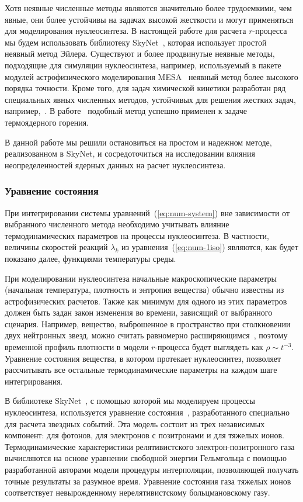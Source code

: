 Хотя неявные численные методы являются значительно более трудоемкими, чем явные, они более устойчивы на задачах высокой жесткости и могут применяться для моделирования нуклеосинтеза. В настоящей работе для расчета $r$-процесса мы будем использовать библиотеку SkyNet~\cite{lippuner2017}, которая использует простой неявный метод Эйлера. Существуют и более продвинутые неявные методы, подходящие для симуляции нуклеосинтеза, например, используемый в пакете модулей астрофизического моделирования MESA~\cite{paxton2011} неявный метод более высокого порядка точности. Кроме того, для задач химической кинетики разработан ряд специальных явных численных методов, устойчивых для решения жестких задач, например,~\cite{bulatov2018}. В работе~\cite{guidry2013} подобный метод успешно применен к задаче термоядерного горения.

В данной работе мы решили остановиться на простом и надежном методе, реализованном в SkyNet, и сосредоточиться на исследовании влияния неопределенностей ядерных данных на расчет нуклеосинтеза.

\subsubsection{Уравнение состояния}
\label{sec:eos}
При интегрировании системы уравнений~(\ref{eq:num-system}) вне зависимости от выбранного численного метода необходимо учитывать влияние термодинамических параметров на процессы нуклеосинтеза. В частности, величины скоростей реакций $\lambda_k$ из уравнения~(\ref{eq:num-1iso}) являются, как будет показано далее, функциями температуры среды. 

При моделировании нуклеосинтеза начальные макроскопические параметры (начальная температура, плотность и энтропия вещества) обычно известны из астрофизических расчетов. Также как минимум для одного из этих параметров должен быть задан закон изменения во времени, зависящий от выбранного сценария. Например, вещество, выброшенное в пространство при столкновении двух нейтронных звезд, можно считать равномерно расширяющимся~\cite{korobkin2012}, поэтому временной профиль плотности в модели $r$-процесса будет выглядеть как $\rho \sim t^{-3}$. Уравнение состояния вещества, в котором протекает нуклеосинтез, позволяет рассчитывать все остальные термодинамические параметры на каждом шаге интегрирования.

В библиотеке SkyNet~\cite{lippuner2017}, с помощью которой мы моделируем процессы нуклеосинтеза, используется уравнение состояния~\cite{timmes1999,timmes2000}, разработанного специально для расчета звездных событий. Эта модель состоит из трех независимых компонент: для фотонов, для электронов с позитронами и для тяжелых ионов. Термодинамические характеристики релятивистского электрон-позитронного газа вычисляются на основе уравнении свободной энергии Гельмгольца с помощью разработанной авторами модели процедуры интерполяции, позволяющей получать точные результаты за разумное время. Уравнение состояния газа тяжелых ионов соответствует невырожденному нерелятивистскому больцмановскому газу.

